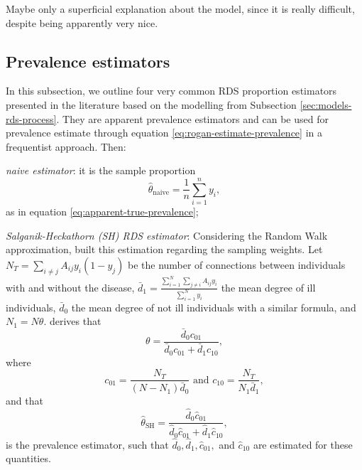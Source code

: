 Maybe only a superficial explanation about the model, since it is really
difficult, despite being apparently very nice. \cite{mclaughlin2021bayesian}

\subsection{Prevalence estimators}

In this subsection, we outline four very common RDS proportion estimators presented in the
literature based on the modelling from Subsection
\ref{sec:models-rds-process}. They are apparent prevalence estimators and can
be used for prevalence estimate through equation
\eqref{eq:rogan-estimate-prevalence} in a frequentist approach. Then:

\begin{alineas}
  \item {\em naive estimator}: it is the sample proportion 
  \begin{equation*}
    \hat{\theta}_{\mathrm{naive}} = \frac{1}{n}\sum_{i=1}^n y_i,
  \end{equation*} 
  as in equation \eqref{eq:apparent-true-prevalence}; 

  \item {\em Salganik-Heckathorn (SH) RDS
  estimator}: Considering the Random Walk
  approximation, \textcite{salganik2004sampling} built this estimation
  regarding the sampling weights. Let $N_T = \sum_{i \neq j} A_{ij}y_i(1-
  y_j)$ be the number of connections between individuals with and without the
  disease, $\bar{d}_1 = \frac{\sum_{i=1}^N \sum_{j \neq i}
  A_{ij}y_i}{\sum_{i=1}^N y_i}$ the mean degree of ill individuals,
  $\bar{d}_0$ the mean degree of not ill individuals with a similar formula,
  and $N_1 = N\theta$. \textcite[p. 218]{salganik2004sampling} derives that 
  \begin{equation*}
    \theta = \frac{\bar{d}_0 c_{01}}{\bar{d}_0 c_{01} + \bar{d}_1 c_{10}},
  \end{equation*}
  where 
  \begin{equation*}
    c_{01} = \frac{N_T}{(N - N_1)\bar{d}_0} \text{ and } c_{10} = \frac{N_T}{N_1\bar{d}_1},
  \end{equation*}
  and that 
  \begin{equation}
    \label{eq:salganik-estimator}
    \hat{\theta}_{\mathrm{SH}} = \frac{\widehat{d}_0 \hat{c}_{01}}{\widehat{d}_0 \hat{c}_{01} + \widehat{d}_1 \hat{c}_{10}},
  \end{equation}
  is the prevalence estimator, such that $\widehat{d}_0, \widehat{d}_1,
  \hat{c}_{01},$ and $\hat{c}_{10}$ are estimated for these quantities. 


\end{alineas}
